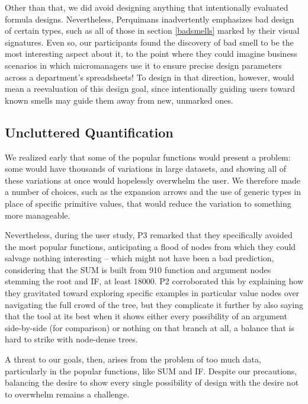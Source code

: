 \documentclass[conference]{IEEEtran}
\newcommand{\toolname}{Perquimans }
\begin{document}
	Other than that, we did avoid designing anything that intentionally evaluated
	formula designs. Nevertheless, \toolname inadvertently emphasizes bad design of
	certain types, such as all of those in section \ref{badsmells} marked by their
	visual signatures. Even so, our participants found the discovery of bad smell
	to be the most interesting aspect about it, to the point where they could
	imagine business scenarios in which micromanagers use it to ensure precise
	design parameters across a department's spreadsheets! To design in that
	direction, however, would mean a reevaluation of this design goal, since
	intentionally guiding users toward known smells may guide them away from new,
	unmarked ones.
	
	\subsection{Uncluttered Quantification}
	
	We realized early that some of the popular functions would present a problem:
	some would have thousands of variations in large datasets, and showing all of
	these variations at once would hopelessly overwhelm the user. We therefore made
	a number of choices, such as the expansion arrows and the use of generic types
	in place of specific primitive values, that would reduce the variation to
	something more manageable.
	
	Nevertheless, during the user study, P3 remarked that they specifically avoided
	the most popular functions, anticipating a flood of nodes from which they could
	salvage nothing interesting -- which might not have been a bad prediction,
	considering that the SUM is built from 910 function and argument nodes stemming
	the root and IF, at least 18000. P2 corroborated this by explaining how they
	gravitated toward exploring specific examples in particular value nodes over
	navigating the full crowd of the tree, but they complicate it further by also
	saying that the tool at its best when it shows either every possibility of an
	argument side-by-side (for comparison) or nothing on that branch at all, a
	balance that is hard to strike with node-dense trees.
	
	A threat to our goals, then, arises from the problem of too much data,
	particularly in the popular functions, like SUM and IF. Despite our
	precautions, balancing the desire to show every single possibility of design
	with the desire not to overwhelm remains a challenge. \par
	
\end{document}
